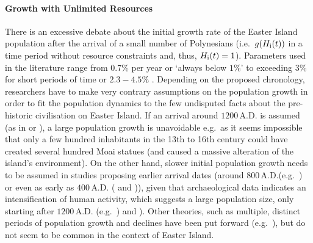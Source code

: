 \paragraph{Growth with Unlimited Resources}
There is an excessive debate about the initial growth rate of the Easter Island population after the arrival of a small number of Polynesians (i.e.\ $g(H_{\rm i}(t))$ in a time period without resource constraints and, thus, $H_{\rm i}(t)=1$).
Parameters used in the literature range from $0.7\%$ per year \citep{Bahn2017} or `always below $1\%$' \citep{Brander1998} to exceeding $3\%$ \citep{Hunt2007} for short periods of time or $2.3-4.5\%$ \citep{Brandt2015}.
Depending on the proposed chronology, researchers have to make very contrary assumptions on the population growth in order to fit the population dynamics to the few undisputed facts about the pre-historic civilisation on Easter Island. 
If an arrival around $1200\, \text{A.D.}$ is assumed (as in \citet{Hunt2007} or \citet{Brandt2015}), a large population growth is unavoidable e.g.\ as it seems impossible that only a few hundred inhabitants in the 13th to 16th century could have created several hundred Moai statues (and caused a massive alteration of the island's environment).
On the other hand, slower initial population growth needs to be assumed in studies proposing earlier arrival dates (around $800\, \text{A.D.}$(e.g.\ \citet{Bahn2017}) or even as early as $400\, \text{A.D.}$ (\citet{Good2006} and \citet{Brander1998})), given that archaeological data indicates an intensification of human activity, which suggests a large population size, only starting after $1200\, \text{A.D.}$ (e.g.\ \citet{Bahn2017}) and \citet{Hunt2007}).
Other theories, such as multiple, distinct periods of population growth and declines have been put forward (e.g.\ \citet{Cole2008}), but do not seem to be common in the context of Easter Island.
